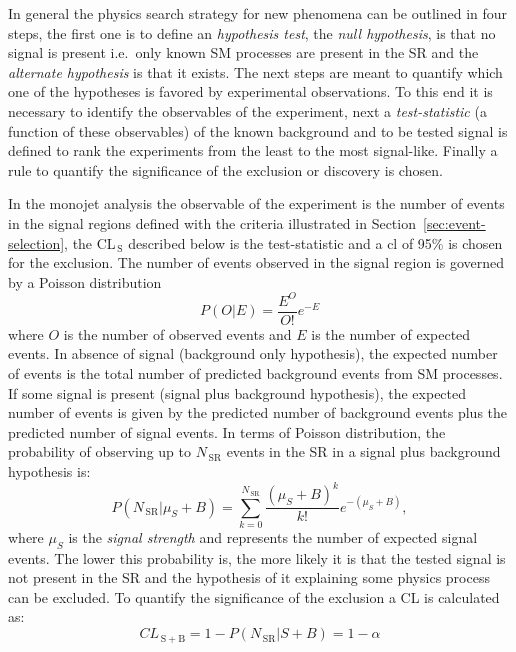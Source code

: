 In general the physics search strategy for new phenomena can be outlined in four
steps, the first one is to define an \emph{hypothesis test}, the \emph{null
  hypothesis}, is that no signal is present i.e.~only known SM processes are
present in the SR and the \emph{alternate hypothesis} is that it exists. The
next steps are meant to quantify which one of the hypotheses is favored by
experimental observations. To this end it is necessary to identify the
observables of the experiment, next a \emph{test-statistic} (a function of
these observables) of the known background and to be tested signal is defined to
rank the experiments from the least to the most signal-like. Finally a rule to
quantify the significance of the exclusion or discovery is chosen.

In the monojet analysis the observable of the experiment is the number of events
in the signal regions defined with the criteria illustrated in
Section~\ref{sec:event-selection}, the CL$_\mathrm{\, S}$ described below is the
test-statistic and a \gls{cl} of 95\% is chosen for the exclusion. The number
of events observed in the signal region is governed by a Poisson distribution
\begin{equation}
  \label{eq:86}
  P(O|E) = \frac{E^O }{O!} e^{- E}
\end{equation}
where $O$ is the number of observed events and $E$ is the number of expected
events. In absence of signal (background only hypothesis), the expected number
of events is the total number of predicted background events from SM
processes. If some signal is present (signal plus background hypothesis), the
expected number of events is given by the predicted number of background events
plus the predicted number of signal events. In terms of Poisson distribution,
the probability of observing up to $N_\mathrm{\, SR}$ events in the SR in a
signal plus background hypothesis is:
\begin{equation}
  \label{eq:87}
  P(N_\mathrm{\, SR}|\mu_S + B) = \sum^{N_\mathrm{\, SR}}_{k = 0} \frac{(\mu_S + B)^k}{k!}
  e^{- (\mu_S + B)},
\end{equation}
where $\mu_S$ is the \emph{signal strength} and represents the number of
expected signal events. The lower this probability is, the more likely it is
that the tested signal is not present in the SR and the hypothesis of it
explaining some physics process can be excluded. To quantify the significance of
the exclusion a CL is calculated as:
\begin{equation}
  \label{eq:88}
  CL_\mathrm{\, S+B} = 1 - P(N_\mathrm{\, SR}|S+B) = 1 - \alpha
\end{equation}
